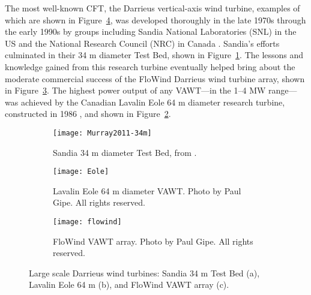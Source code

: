The most well-known CFT, the Darrieus vertical-axis wind turbine, examples of
which are shown in Figure~\ref{fig:Darrieus}, was developed thoroughly in the
late 1970s through the early 1990s by groups including Sandia National
Laboratories (SNL) in the US and the National Research Council (NRC) in Canada
\cite{Para2002}. Sandia's efforts culminated in their 34 m diameter Test Bed,
shown in Figure~\ref{fig:Sandia-34m}. The lessons and knowledge gained from this
research turbine eventually helped bring about the moderate commercial success
of the FloWind Darrieus wind turbine array, shown in Figure~\ref{fig:FloWind}.
The highest power output of any VAWT---in the 1--4 MW range---was achieved by
the Canadian Lavalin Eole 64 m diameter research turbine, constructed in 1986
\cite{Para2002}, and shown in Figure~\ref{fig:Eole}.

\begin{figure}
    \centering

    \begin{subfigure}[b]{0.625\textwidth}
        \centering

        \texttt{[image: Murray2011-34m]}

        \caption{Sandia 34 m diameter Test Bed, from \cite{Murray2011}.}

        \label{fig:Sandia-34m}
    \end{subfigure}
    \hfill
    \begin{subfigure}[b]{0.352\textwidth}
        \centering

        \texttt{[image: Eole]}

        \caption{Lavalin Eole 64 m diameter VAWT. Photo by Paul Gipe. All rights
            reserved.}

        \label{fig:Eole}
    \end{subfigure}

    \begin{subfigure}[b]{0.8\textwidth}
        \centering

        \texttt{[image: flowind]}

        \caption{FloWind VAWT array. Photo by Paul Gipe. All rights reserved.}

        \label{fig:FloWind}
    \end{subfigure}

    \caption{Large scale Darrieus wind turbines: Sandia 34 m Test Bed (a),
        Lavalin Eole 64 m (b), and FloWind VAWT array (c).}

    \label{fig:Darrieus}
\end{figure}

